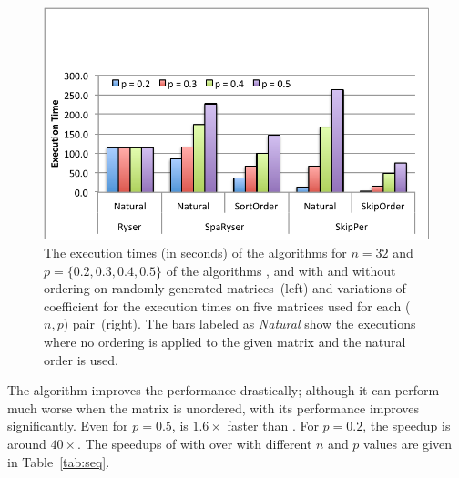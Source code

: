 \documentclass{elektr}
\begin{document}
{\begin{figure}[!htbp]
    \centering
\includegraphics[width=0.5\linewidth]{fig2}
    \qquad
    \captionsetup{labelformat=andtable}
    \caption{The execution times (in seconds) of the algorithms for $n = 32$ and $p = \{0.2, 0.3, 0.4, 0.5\}$ of the algorithms {}, {} and {} with and without ordering on randomly generated matrices~(left) and variations of coefficient for the execution times on five matrices used for each ($n, p$) pair~(right). The bars labeled as {\em{Natural}} show the executions where no ordering is applied to the given matrix and the natural order is used. }
    \label{firstfig}
     \end{figure}

 The algorithm {} improves the performance drastically; although it can perform much worse when the matrix is unordered, with {} its performance improves significantly. Even for $p = 0.5$,  {} is $1.6\times$ faster than {}. For $p = 0.2$, the speedup is around $40\times$. The speedups of {} with {} over {} with different $n$ and $p$ values are given in Table~\ref{tab:seq}.

}
\end{document}
